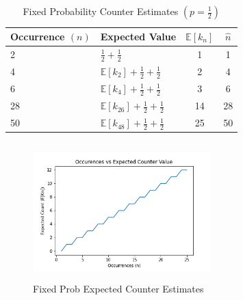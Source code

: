 \documentclass[longpaper, english, final, times]{revdetua}
\begin{document}
		\begin{table}[!ht!]
			\begin{center}
				\label{table:fixedProbCounterExpectedEstimate}
				\caption{Fixed Probability Counter Estimates $\left(p=\frac{1}{2}\right)$}	
				{\def\arraystretch{2}%
					\begin{tabular}{l|l|c|c}
						\toprule
						Occurrence $(n)$ & Expected Value& $\mathbb{E}[k_n]$ & $\widehat{n}$\\
						\hline
						2&$\frac{1}{2}+\frac{1}{2}$&1&1\\
						4&$\mathbb{E}[k_{2}]+\frac{1}{2}+\frac{1}{2}$&2&4\\
						6& $\mathbb{E}[k_{4}]+\frac{1}{2}+\frac{1}{2}$&3&6\\
						28 & $\mathbb{E}[k_{26}]+\frac{1}{2}+\frac{1}{2}$&14&28\\
						50 & $\mathbb{E}[k_{48}]+\frac{1}{2}+\frac{1}{2}$&25&50\\
						\bottomrule
					\end{tabular}
				}
			\end{center}
		\end{table}
		\begin{figure}[ht!]
			\centering
			\caption{Fixed Prob Expected Counter Estimates}
			\includegraphics[width=260px, height=200px]{imgs/fixed.png}		
		\end{figure}	
	
\end{document}

